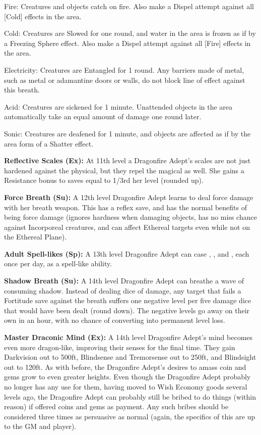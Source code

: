 \begin{itemize*}
\item Fire: Creatures and objects catch on fire. Also make a Dispel attempt against all [Cold] effects in the area.
\item Cold: Creatures are Slowed for one round, and water in the area is frozen as if by a Freezing Sphere effect. Also make a Dispel attempt against all [Fire] effects in the area.
\item Electricity: Creatures are Entangled for 1 round. Any barriers made of metal, such as metal or adamantine doors or walls, do not block line of effect against this breath.
\item Acid: Creatures are sickened for 1 minute. Unattended objects in the area automatically take an equal amount of damage one round later.
\item Sonic: Creatures are deafened for 1 minute, and objects are affected as if by the area form of a Shatter effect.
\end{itemize*}

\textbf{Reflective Scales (Ex):} At 11th level a Dragonfire Adept's scales are not just hardened against the physical, but they repel the magical as well. She gains a Resistance bonus to saves equal to 1/3rd her level (rounded up).

\textbf{Force Breath (Su):} A 12th level Dragonfire Adept learns to deal force damage with her breath weapon. This has a reflex save, and has the normal benefits of being force damage (ignores hardness when damaging objects, has no miss chance against Incorporeal creatures, and can affect Ethereal targets even while not on the Ethereal Plane).

\textbf{Adult Spell-likes (Sp):} A 13th level Dragonfire Adept can case , , and , each once per day, as a spell-like ability.

\textbf{Shadow Breath (Su):} A 14th level Dragonfire Adept can breathe a wave of consuming shadow. Instead of dealing dice of damage, any target that fails a Fortitude save against the breath suffers one negative level per five damage dice that would have been dealt (round down). The negative levels go away on their own in an hour, with no chance of converting into permanent level loss.

\textbf{Master Draconic Mind (Ex):} A 14th level Dragonfire Adept's mind becomes even more dragon-like, improving their senses for the final time. They gain Darkvision out to 500ft, Blindsense and Tremorsense out to 250ft, and Blindsight out to 120ft. As with before, the Dragonfire Adept's desires to amass coin and gems grow to even greater heights. Even though the Dragonfire Adept probably no longer has any use for them, having moved to Wish Economy goods several levels ago, the Dragonfire Adept can probably still be bribed to do things (within reason) if offered coins and gems as payment. Any such bribes should be considered three times as persuasive as normal (again, the specifics of this are up to the GM and player).

